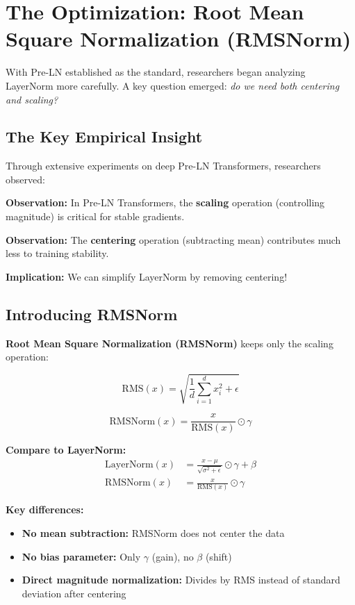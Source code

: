 \documentclass{article}
\begin{document}
\section{The Optimization: Root Mean Square Normalization (RMSNorm)}

With Pre-LN established as the standard, researchers began analyzing LayerNorm more carefully. A key question emerged: \textit{do we need both centering and scaling?}

\subsection{The Key Empirical Insight}

Through extensive experiments on deep Pre-LN Transformers, researchers observed:

\begin{tcolorbox}[colback=blue!5!white, colframe=blue!50!black, title=The Centering vs Scaling Question]
\textbf{Observation:} In Pre-LN Transformers, the \textbf{scaling} operation (controlling magnitude) is critical for stable gradients.

\textbf{Observation:} The \textbf{centering} operation (subtracting mean) contributes much less to training stability.

\textbf{Implication:} We can simplify LayerNorm by removing centering!
\end{tcolorbox}

\subsection{Introducing RMSNorm}

\textbf{Root Mean Square Normalization (RMSNorm)} keeps only the scaling operation:

\[
\text{RMS}(x) = \sqrt{\frac{1}{d}\sum_{i=1}^d x_i^2 + \epsilon}
\]

\[
\text{RMSNorm}(x) = \frac{x}{\text{RMS}(x)} \odot \gamma
\]

\textbf{Compare to LayerNorm:}
\begin{align}
\text{LayerNorm}(x) &= \frac{x - \mu}{\sqrt{\sigma^2 + \epsilon}} \odot \gamma + \beta \\
\text{RMSNorm}(x) &= \frac{x}{\text{RMS}(x)} \odot \gamma
\end{align}

\textbf{Key differences:}
\begin{itemize}
\item \textbf{No mean subtraction:} RMSNorm does not center the data
\item \textbf{No bias parameter:} Only $\gamma$ (gain), no $\beta$ (shift)
\item \textbf{Direct magnitude normalization:} Divides by RMS instead of standard deviation after centering
\end{itemize}
\end{document}
